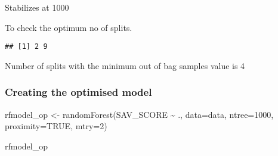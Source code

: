 \documentclass[
]{article}
\newenvironment{Shaded}{\begin{snugshade}}{\end{snugshade}}
\newcommand{\AttributeTok}[1]{\textcolor[rgb]{0.77,0.63,0.00}{#1}}
\newcommand{\ConstantTok}[1]{\textcolor[rgb]{0.00,0.00,0.00}{#1}}
\newcommand{\ControlFlowTok}[1]{\textcolor[rgb]{0.13,0.29,0.53}{\textbf{#1}}}
\newcommand{\DecValTok}[1]{\textcolor[rgb]{0.00,0.00,0.81}{#1}}
\newcommand{\FunctionTok}[1]{\textcolor[rgb]{0.00,0.00,0.00}{#1}}
\newcommand{\NormalTok}[1]{#1}
\newcommand{\OtherTok}[1]{\textcolor[rgb]{0.56,0.35,0.01}{#1}}
\newcommand{\SpecialCharTok}[1]{\textcolor[rgb]{0.00,0.00,0.00}{#1}}
\begin{document}
Stabilizes at 1000

To check the optimum no of splits.

\begin{Shaded}
\end{Shaded}

\begin{verbatim}
## [1] 2 9
\end{verbatim}

Number of splits with the minimum out of bag samples value is 4

\hypertarget{creating-the-optimised-model}{%
\subsubsection{Creating the optimised
model}\label{creating-the-optimised-model}}

\begin{Shaded}
\begin{Highlighting}[]
\NormalTok{rfmodel\_op }\OtherTok{\textless{}{-}} \FunctionTok{randomForest}\NormalTok{(SAV\_SCORE }\SpecialCharTok{\textasciitilde{}}\NormalTok{ ., }
                      \AttributeTok{data=}\NormalTok{data,}
                      \AttributeTok{ntree=}\DecValTok{1000}\NormalTok{, }
                      \AttributeTok{proximity=}\ConstantTok{TRUE}\NormalTok{, }
                      \AttributeTok{mtry=}\DecValTok{2}\NormalTok{)}

\NormalTok{rfmodel\_op}
\end{Highlighting}
\end{Shaded}
\end{document}
